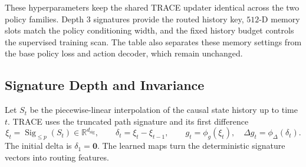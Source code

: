 \documentclass{article}
\begin{document}
\begin{table}[H]
    \centering
    \caption{Core TRACE hyperparameters.}
    \label{tab:prism_hparams}
    \setlength{\tabcolsep}{4pt}
    \renewcommand{\arraystretch}{1.05}
\end{table}

These hyperparameters keep the shared TRACE updater identical across the two policy families. Depth $3$ signatures provide the routed history key, $512$-D memory slots match the policy conditioning width, and the fixed history budget controls the supervised training scan. The table also separates these memory settings from the base policy loss and action decoder, which remain unchanged.

\subsection{Signature Depth and Invariance}
\label{app:signature_depth}

Let $S_t$ be the piecewise-linear interpolation of the causal state history up to time $t$. TRACE uses the truncated path signature and its first difference
\begin{equation}
    \xi_t =
    \operatorname{Sig}_{\leq p}(S_t)
    \in\mathbb{R}^{d_{\mathrm{sig}}},
    \qquad
    \delta_t=\xi_t-\xi_{t-1},
    \qquad
    g_t=\phi_g(\xi_t),
    \quad
    \Delta g_t=\phi_{\Delta}(\delta_t).
    \label{eq:delta_signature}
\end{equation}
The initial delta is $\delta_1=\mathbf{0}$. The learned maps turn the deterministic signature vectors into routing features.
\end{document}
